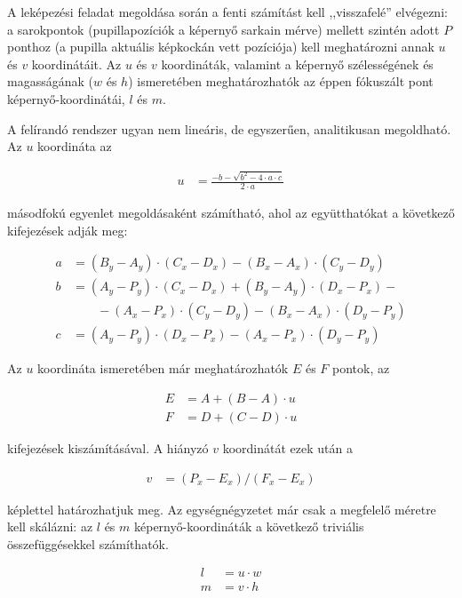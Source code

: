 A leképezési feladat megoldása során a fenti számítást kell ,,visszafelé'' elvégezni: a sarokpontok (pupillapozíciók a képernyő sarkain mérve) mellett szintén adott $P$ ponthoz (a pupilla aktuális képkockán vett pozíciója) kell meghatározni annak $u$ és $v$ koordinátáit. Az $u$ és $v$ koordináták, valamint a képernyő szélességének és magasságának ($w$ és $h$) ismeretében meghatározhatók az éppen fókuszált pont képernyő-koordinátái, $l$ és $m$.

A felírandó rendszer ugyan nem lineáris, de egyszerűen, analitikusan megoldható. Az $u$ koordináta az

\begin{align}\label{eq:calib_1}
u &= \frac{-b - \sqrt{b^2 - 4 \cdot a \cdot c}}{2 \cdot a}
\end{align}

másodfokú egyenlet megoldásaként számítható, ahol az együtthatókat a következő kifejezések adják meg:

\begin{align}\label{eq:calib_2}
a &= (B_y - A_y) \cdot (C_x - D_x) - (B_x - A_x) \cdot (C_y - D_y) \nonumber \\
b &= (A_y - P_y) \cdot (C_x - D_x) + (B_y - A_y) \cdot (D_x - P_x) - \nonumber \\ 
  & \qquad - (A_x - P_x) \cdot (C_y - D_y) - (B_x - A_x) \cdot (D_y - P_y) \nonumber \\
c &= (A_y - P_y) \cdot (D_x - P_x) - (A_x - P_x) \cdot (D_y - P_y)
\end{align}

Az $u$ koordináta ismeretében már meghatározhatók $E$ és $F$ pontok, az

\begin{align}\label{eq:calib_3}
E &= A + (B-A) \cdot u \nonumber \\
F &= D + (C-D) \cdot u
\end{align}

kifejezések kiszámításával. A hiányzó $v$ koordinátát ezek után a 

\begin{align}\label{eq:calib_4}
v &= (P_x - E_x) / (F_x - E_x)
\end{align}

képlettel határozhatjuk meg. Az egységnégyzetet már csak a megfelelő méretre kell skálázni: az $l$ és $m$ képernyő-koordináták a következő triviális összefüggésekkel számíthatók.

\begin{align}\label{eq:calib_5}
l &= u \cdot w \nonumber \\
m &= v \cdot h
\end{align}


